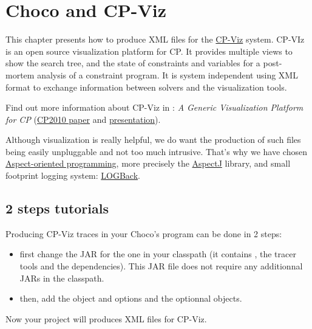 \label{chocoandcpviz}
\hypertarget{chocoandcpviz}{}

\chapter{Choco and CP-Viz}\label{chocoandcpviz:chocoandcpviz}\hypertarget{chocoandcpviz:chocoandcpviz}{}

This chapter presents how to produce XML files for the \href{http://sourceforge.net/projects/cpviz/}{{CP-Viz}} system. CP-VIz is an open source visualization platform for CP. It provides multiple views to show the search tree, and the state of constraints and variables for a post- mortem analysis of a constraint program. It is system independent using XML format to exchange information between solvers and the visualization tools.

\medskip
Find out more information about CP-Viz in  \cite{Simonis10}: \emph{A Generic Visualization Platform for CP} (\href{http://www.4c.ucc.ie/~hsimonis/cpviz-cp2010-paper.pdf}{{CP2010 paper}} and \href{http://www.4c.ucc.ie/~hsimonis/cpviz-cp2010-slides.pdf}{{presentation}}).

\medskip
Although visualization is really helpful, we do want the production of such files being easily unpluggable and not too much intrusive. That's why we have chosen \href{http://en.wikipedia.org/wiki/Aspect-oriented_programming}{{Aspect-oriented programming}}, more precisely the \href{http://www.eclipse.org/aspectj/}{{AspectJ}} library, and small footprint logging system: \href{http://logback.qos.ch/}{{LOGBack}}. 

\section{2 steps tutorials}\label{chocoandcpviz:2stepstuto}\hypertarget{chocoandcpviz:2stepstuto}{}

Producing CP-Viz traces in your Choco's program can be done in 2 steps:

\begin{itemize}
\item first change the  JAR for the  one in your classpath (it contains , the tracer tools and the dependencies). This JAR file does not require any additionnal JARs in the classpath.
\item then, add the  object and options and the optionnal  objects.
\end{itemize}
Now your project will produces XML files for CP-Viz.
\medskip
